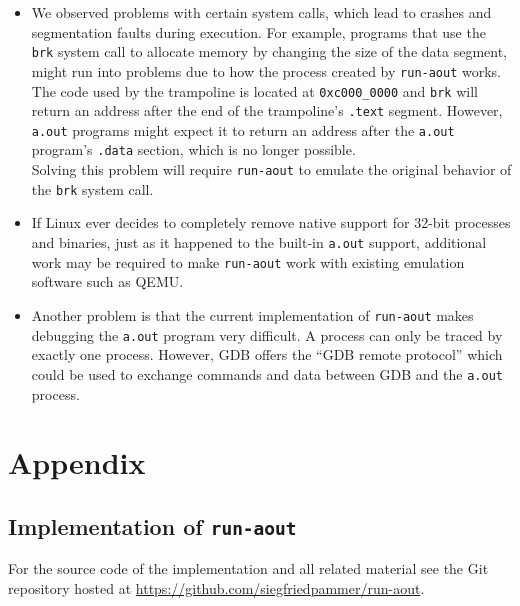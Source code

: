 \documentclass[draft,final]{vutinfth} %
\begin{document}
\begin{itemize}
    \item We observed problems with certain system calls, which lead to crashes and segmentation faults during execution. For example, programs that use the \texttt{brk} system call to allocate memory by changing the size of the data segment, might run into problems due to how the process created by \texttt{run-aout} works.\\
    The code used by the trampoline is located at \texttt{0xc000\_0000} and \texttt{brk} will return an address after the end of the trampoline's \texttt{.text} segment. However, \texttt{a.out} programs might expect it to return an address after the \texttt{a.out} program's \texttt{.data} section, which is no longer possible.\\
    Solving this problem will require \texttt{run-aout} to emulate the original behavior of the \texttt{brk} system call.
    
    \item If Linux ever decides to completely remove native support for 32-bit processes and binaries, just as it happened to the built-in \texttt{a.out} support, additional work may be required to make \texttt{run-aout} work with existing emulation software such as QEMU.
    
    \item Another problem is that the current implementation of \texttt{run-aout} makes debugging the \texttt{a.out} program very difficult. A process can only be traced by exactly one process. However, GDB offers the ``GDB remote protocol'' \cite{GDBRemoteProtocol} which could be used to exchange commands and data between GDB and the \texttt{a.out} process.
\end{itemize}

\newpage
\printbibliography

\newpage
\listoffigures

\listoftables

\lstlistoflistings

\newpage
\chapter*{Appendix}

\section{Implementation of \texttt{run-aout}}
\label{impl}

For the source code of the implementation and all related material see the Git repository hosted at \url{https://github.com/siegfriedpammer/run-aout}.
\end{document}
